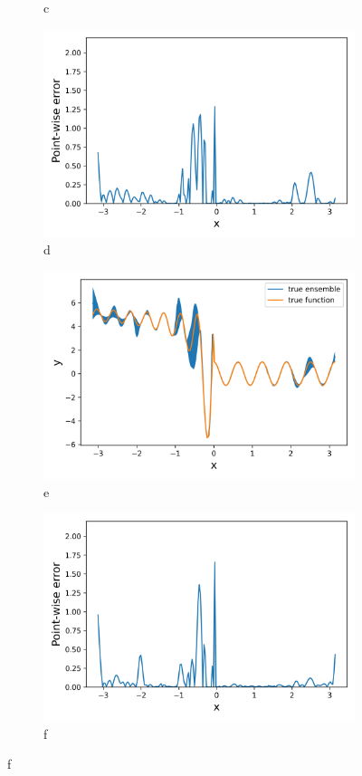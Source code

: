 \begin{figure}[htbp]
\begin{subfigure}{.45\textwidth}
		\caption{c}
	\end{subfigure}
	\begin{subfigure}{.45\textwidth}
		\centering
		\includegraphics[width=1\linewidth]{./figs/snap_rep_err.png}  
		\caption{d}
	\end{subfigure}
	\begin{subfigure}{.45\textwidth}
		\centering
		\includegraphics[width=1\linewidth]{./figs/ens_rep_fun.png}  
		\caption{e}
	\end{subfigure}
	\begin{subfigure}{.45\textwidth}
		\centering
		\includegraphics[width=1\linewidth]{./figs/ens_rep_err.png}  
		\caption{f}
	\end{subfigure}
\end{figure}

